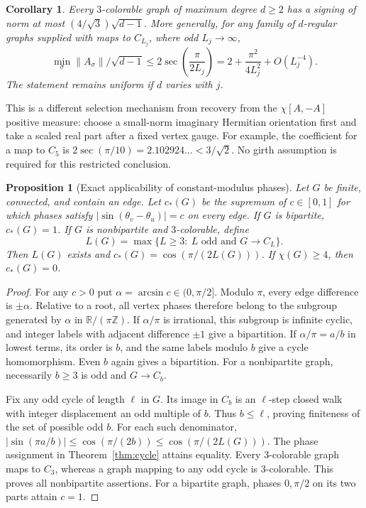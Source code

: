\documentclass[11pt]{article}
\newtheorem{proposition}{Proposition}
\newtheorem{corollary}{Corollary}
\newcommand{\norm}[1]{\left\lVert #1\right\rVert}
\begin{document}
\begin{corollary}
Every $3$-colorable graph of maximum degree $d\ge2$ has a signing of
norm at most $(4/\sqrt3)\sqrt{d-1}$. More generally, for any family of
$d$-regular graphs supplied with maps to $C_{L_j}$, where odd $L_j\to\infty$,
\[
 \min_\sigma\norm{A_\sigma}/\sqrt{d-1}
 \le 2\sec\!\left(\frac{\pi}{2L_j}\right)
 =2+\frac{\pi^2}{4L_j^2}+O(L_j^{-4}).
\]
The statement remains uniform if $d$ varies with $j$.
\end{corollary}

This is a different selection mechanism from recovery from the
$\chi[A,-A]$ positive measure: choose a small-norm imaginary Hermitian
orientation first and take a scaled real part after a fixed vertex gauge.
For example, the coefficient for a map to $C_5$ is
$2\sec(\pi/10)=2.102924\ldots<3/\sqrt2$.
No girth assumption is required for this restricted conclusion.

\begin{proposition}[Exact applicability of constant-modulus phases]
Let $G$ be finite, connected, and contain an edge. Let $c_*(G)$ be the
supremum of $c\in[0,1]$ for which phases satisfy
$|\sin(\theta_v-\theta_u)|=c$ on every edge. If $G$ is bipartite,
$c_*(G)=1$. If $G$ is nonbipartite and $3$-colorable, define
\[
 L(G)=\max\{L\ge3:\ L\text{ odd and }G\to C_L\}.
\]
Then $L(G)$ exists and $c_*(G)=\cos(\pi/(2L(G)))$.
If $\chi(G)\ge4$, then $c_*(G)=0$.
\end{proposition}
\begin{proof}
For any $c>0$ put $\alpha=\arcsin c\in(0,\pi/2]$. Modulo $\pi$,
every edge difference is $\pm\alpha$. Relative to a root, all vertex
phases therefore belong to the subgroup generated by $\alpha$ in
$\mathbb R/(\pi\mathbb Z)$. If $\alpha/\pi$ is irrational, this
subgroup is infinite cyclic, and integer labels with adjacent difference
$\pm1$ give a bipartition. If $\alpha/\pi=a/b$ in lowest terms, its
order is $b$, and the same labels modulo $b$ give a cycle homomorphism.
Even $b$ again gives a bipartition. For a nonbipartite graph, necessarily
$b\ge3$ is odd and $G\to C_b$.

Fix any odd cycle of length $\ell$ in $G$. Its image in $C_b$ is an
$\ell$-step closed walk with integer displacement an odd multiple of $b$.
Thus $b\le\ell$, proving finiteness of the set of possible odd $b$.
For each such denominator,
$|\sin(\pi a/b)|\le\cos(\pi/(2b))\le\cos(\pi/(2L(G)))$.
The phase assignment in Theorem~\ref{thm:cycle} attains equality.
Every $3$-colorable graph maps to $C_3$, whereas a graph mapping to any
odd cycle is $3$-colorable. This proves all nonbipartite assertions.
For a bipartite graph, phases $0,\pi/2$ on its two parts attain $c=1$.
\end{proof}
\end{document}
